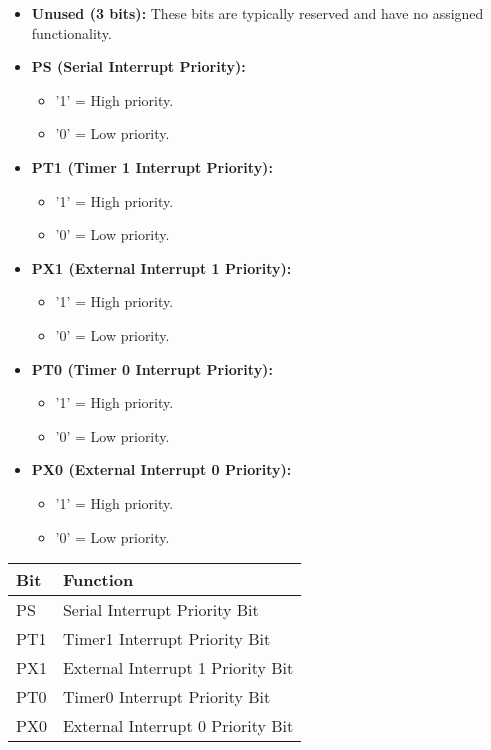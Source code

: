 \documentclass[
]{article}
\begin{document}
\begin{itemize}
\item
  \textbf{Unused (3 bits):} These bits are typically reserved and have
  no assigned functionality.
\item
  \textbf{PS (Serial Interrupt Priority):}

  \begin{itemize}
  \item
    '1' = High priority.
  \item
    '0' = Low priority.
  \end{itemize}
\item
  \textbf{PT1 (Timer 1 Interrupt Priority):}

  \begin{itemize}
  \item
    '1' = High priority.
  \item
    '0' = Low priority.
  \end{itemize}
\item
  \textbf{PX1 (External Interrupt 1 Priority):}

  \begin{itemize}
  \item
    '1' = High priority.
  \item
    '0' = Low priority.
  \end{itemize}
\item
  \textbf{PT0 (Timer 0 Interrupt Priority):}

  \begin{itemize}
  \item
    '1' = High priority.
  \item
    '0' = Low priority.
  \end{itemize}
\item
  \textbf{PX0 (External Interrupt 0 Priority):}

  \begin{itemize}
  \item
    '1' = High priority.
  \item
    '0' = Low priority.
  \end{itemize}
\end{itemize}

\begin{longtable}[]{@{}ll@{}}
\toprule
Bit & Function \\
\midrule
\endhead
PS & Serial Interrupt Priority Bit \\
PT1 & Timer1 Interrupt Priority Bit \\
PX1 & External Interrupt 1 Priority Bit \\
PT0 & Timer0 Interrupt Priority Bit \\
PX0 & External Interrupt 0 Priority Bit \\
\bottomrule
\end{longtable}
\end{document}
